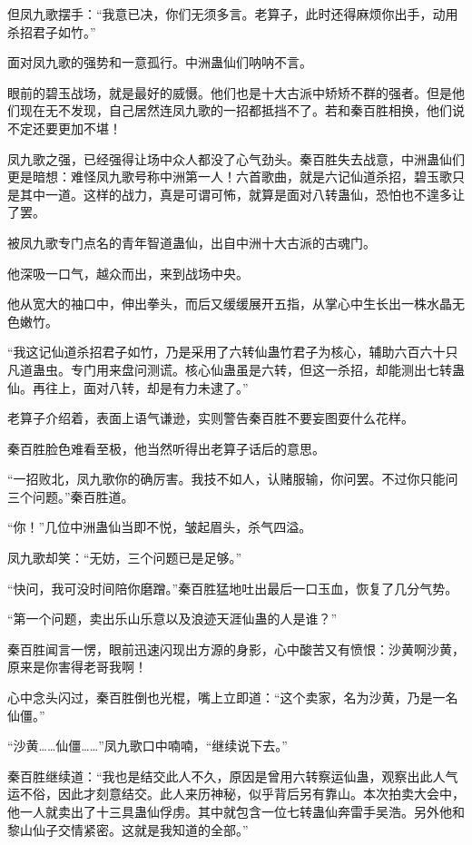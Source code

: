 \begin{this_body}
但凤九歌摆手：“我意已决，你们无须多言。老算子，此时还得麻烦你出手，动用杀招君子如竹。”

面对凤九歌的强势和一意孤行。中洲蛊仙们呐呐不言。

眼前的碧玉战场，就是最好的威慑。他们也是十大古派中矫矫不群的强者。但是他们现在无不发现，自己居然连凤九歌的一招都抵挡不了。若和秦百胜相换，他们说不定还要更加不堪！

凤九歌之强，已经强得让场中众人都没了心气劲头。秦百胜失去战意，中洲蛊仙们更是暗想：难怪凤九歌号称中洲第一人！六首歌曲，就是六记仙道杀招，碧玉歌只是其中一道。这样的战力，真是可谓可怖，就算是面对八转蛊仙，恐怕也不遑多让了罢。

被凤九歌专门点名的青年智道蛊仙，出自中洲十大古派的古魂门。

他深吸一口气，越众而出，来到战场中央。

他从宽大的袖口中，伸出拳头，而后又缓缓展开五指，从掌心中生长出一株水晶无色嫩竹。

“我这记仙道杀招君子如竹，乃是采用了六转仙蛊竹君子为核心，辅助六百六十只凡道蛊虫。专门用来盘问测谎。核心仙蛊虽是六转，但这一杀招，却能测出七转蛊仙。再往上，面对八转，却是有力未逮了。”

老算子介绍着，表面上语气谦逊，实则警告秦百胜不要妄图耍什么花样。

秦百胜脸色难看至极，他当然听得出老算子话后的意思。

“一招败北，凤九歌你的确厉害。我技不如人，认赌服输，你问罢。不过你只能问三个问题。”秦百胜道。

“你！”几位中洲蛊仙当即不悦，皱起眉头，杀气四溢。

凤九歌却笑：“无妨，三个问题已是足够。”

“快问，我可没时间陪你磨蹭。”秦百胜猛地吐出最后一口玉血，恢复了几分气势。

“第一个问题，卖出乐山乐意以及浪迹天涯仙蛊的人是谁？”

秦百胜闻言一愣，眼前迅速闪现出方源的身影，心中酸苦又有愤恨：沙黄啊沙黄，原来是你害得老哥我啊！

心中念头闪过，秦百胜倒也光棍，嘴上立即道：“这个卖家，名为沙黄，乃是一名仙僵。”

“沙黄……仙僵……”凤九歌口中喃喃，“继续说下去。”

秦百胜继续道：“我也是结交此人不久，原因是曾用六转察运仙蛊，观察出此人气运不俗，因此才刻意结交。此人来历神秘，似乎背后另有靠山。本次拍卖大会中，他一人就卖出了十三具蛊仙俘虏。其中就包含一位七转蛊仙奔雷手吴浩。另外他和黎山仙子交情紧密。这就是我知道的全部。”


\end{this_body}
